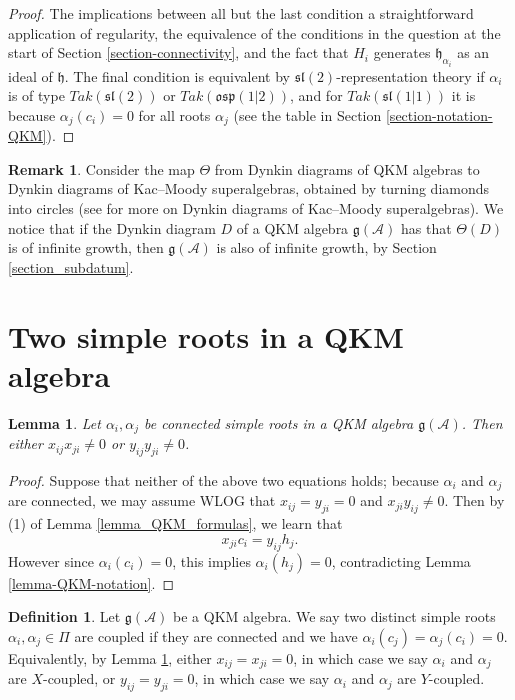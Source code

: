 \documentclass[12pt, a4paper, reqno]{amsart}
\def\AA{\mathcal{A}}
\def\p{\mathfrak{p}}
\def\g{\mathfrak{g}}
\def\h{\mathfrak{h}}
\def\l{\mathfrak{l}}
\def\s{\mathfrak{s}}
\def\o{\mathfrak{o}}
\newtheorem{lemma}{Lemma}
\theoremstyle{definition}
\newtheorem{definition}{Definition}
\theoremstyle{definition}
\newtheorem{remark}{Remark}
\theoremstyle{definition}
\numberwithin{theorem}{section}
\numberwithin{lemma}{section}
\numberwithin{remark}{section}
\numberwithin{definition}{section}
\numberwithin{corollary}{section}
\numberwithin{proposition}{section}
\numberwithin{example}{section}
\begin{document}
	\begin{proof}
		The implications between all but the last condition a straightforward application of regularity, the equivalence of the conditions in the question at the start of Section \ref{section-connectivity}, and the fact that $H_i$ generates $\h_{\alpha_i}$ as an ideal of $\h$.  The final condition is equivalent by $\s\l(2)$-representation theory if $\alpha_i$ is of type $Tak(\s\l(2))$ or $Tak(\o\s\p(1|2))$, and for $Tak(\s\l(1|1))$ it is because $\alpha_j(c_i)=0$ for all roots $\alpha_j$ (see the table in Section \ref{section-notation-QKM}).
	\end{proof}
	
	\begin{remark}\label{remark_dynkin_diagram}
		Consider the map $\Theta$ from Dynkin diagrams of QKM algebras to Dynkin diagrams of Kac--Moody superalgebras, obtained by turning diamonds into circles (see \cite{K2} for more on Dynkin diagrams of Kac--Moody superalgebras).  We notice that if the Dynkin diagram $D$ of a QKM algebra \(\mathfrak{g}(\mathcal{A})\) has that $\Theta(D)$ is of infinite growth, then $\g(\AA)$ is also of infinite growth, by Section \ref{section_subdatum}.  
	\end{remark}
	
	\section{Two simple roots in a QKM algebra}\label{section-two-simple-roots}
	
	\begin{lemma}\label{lemma_coupled_defn_justif}
		Let $\alpha_i,\alpha_j$ be connected simple roots in a QKM algebra $\g(\AA)$.  Then either $x_{ij}x_{ji}\neq0$ or $y_{ij}y_{ji}\neq0$.
	\end{lemma}
	\begin{proof}
		Suppose that neither of the above two equations holds; because $\alpha_i$ and $\alpha_j$ are connected, we may assume WLOG that $x_{ij}=y_{ji}=0$ and $x_{ji}y_{ij}\neq0$. Then by (1) of Lemma \ref{lemma_QKM_formulas}, we learn that
		\[
		x_{ji}c_i=y_{ij}h_j.
		\]
		However since $\alpha_i(c_i)=0$, this implies $\alpha_i(h_j)=0$, contradicting Lemma \ref{lemma-QKM-notation}.
	\end{proof}
	
	\begin{definition}\label{definition_coupling}
		Let \(\mathfrak{g}(\mathcal{A})\) be a QKM algebra. We say two distinct simple roots \(\alpha_i,\alpha_j \in \Pi\) are coupled if they are connected and we have $\alpha_i(c_j)=\alpha_j(c_i)=0$.  Equivalently, by Lemma \ref{lemma_coupled_defn_justif}, either $x_{ij}=x_{ji}=0$, in which case we say $\alpha_i$ and $\alpha_j$ are $X$-coupled, or $y_{ij}=y_{ji}=0$, in which case we say $\alpha_i$ and $\alpha_j$ are $Y$-coupled.  
	\end{definition}
	
\end{document}
